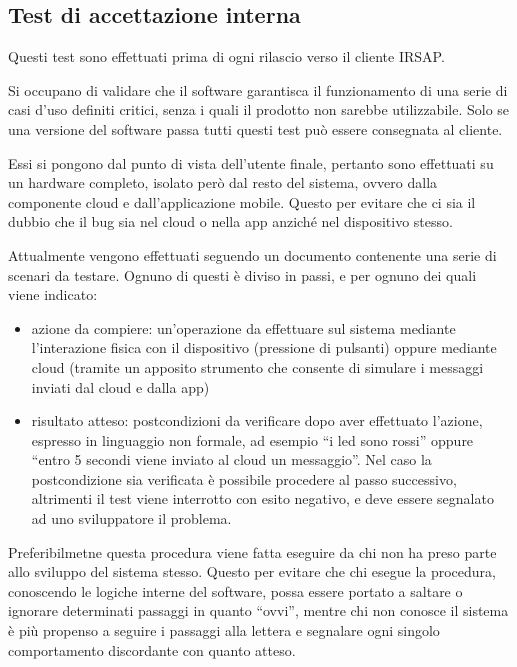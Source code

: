 \documentclass[12pt,a4paper,twoside,titlepage]{book}
\begin{document}
\subsection{Test di accettazione interna}

Questi test sono effettuati prima di ogni rilascio verso il cliente IRSAP.

Si occupano di validare che il software garantisca il funzionamento di una serie di casi d'uso
definiti critici, senza i quali il prodotto non sarebbe utilizzabile.
Solo se una versione del software passa tutti questi test può essere consegnata al cliente.

Essi si pongono dal punto di vista dell'utente finale, pertanto sono effettuati su un
hardware completo, isolato però dal resto del sistema, ovvero dalla componente cloud
e dall'applicazione mobile. Questo per evitare che ci sia il dubbio che il bug sia
nel cloud o nella app anziché nel dispositivo stesso.

Attualmente vengono effettuati seguendo un documento contenente una serie di scenari da testare.
Ognuno di questi è diviso in passi, e per ognuno dei quali viene indicato:

\begin{itemize}
    \item azione da compiere: un'operazione da effettuare sul sistema mediante l'interazione fisica
        con il dispositivo (pressione di pulsanti) oppure mediante cloud (tramite un apposito
        strumento che consente di simulare i messaggi inviati dal cloud e dalla app)
    \item risultato atteso: postcondizioni da verificare dopo aver effettuato l'azione, espresso in
        linguaggio non formale, ad esempio ``i led sono rossi'' oppure ``entro 5 secondi viene inviato al cloud un messaggio''.
        Nel caso la postcondizione sia verificata è possibile procedere al passo successivo, altrimenti
        il test viene interrotto con esito negativo, e deve essere segnalato ad uno sviluppatore il problema.
\end{itemize}

Preferibilmetne questa procedura viene fatta eseguire da chi non ha preso parte allo
sviluppo del sistema stesso. Questo per evitare che chi esegue la procedura, conoscendo
le logiche interne del software, possa essere portato a saltare o ignorare determinati
passaggi in quanto ``ovvi'', mentre chi non conosce il sistema è più propenso a seguire
i passaggi alla lettera e segnalare ogni singolo comportamento discordante con quanto
atteso.
\end{document}

